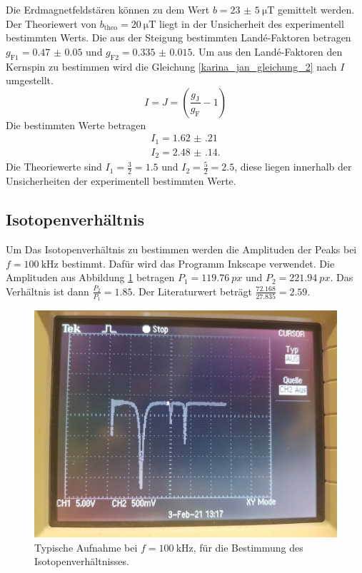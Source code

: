 \FloatBarrier
Die Erdmagnetfeldstären können zu dem Wert $b=\SI{23(5)}{\micro\tesla}$ gemittelt werden. Der Theoriewert von $b_{\text{theo}}=\SI{20}{\micro\tesla}$
liegt in der Unsicherheit des experimentell bestimmten Werts. 
Die aus der Steigung bestimmten Landé-Faktoren betragen $g_{\text{F1}}=\num{0.47(5)}$ und $g_{\text{F2}} = \num{0.335(15)}$.
Um aus den Landé-Faktoren den Kernspin zu bestimmen wird die Gleichung \ref{karina_jan_gleichung_2} nach $I$ umgestellt.
\begin{equation*}
  I=J=\left(\frac{g_{\text{J}}}{g_{\text{F}}}-1\right)
\end{equation*}
Die bestimmten Werte betragen 
\begin{gather*}
  I_1 = \num{1.62(21)}\\
  I_2 = \num{2.48(14)}.
\end{gather*}
Die Theoriewerte sind $I_1 = \frac{3}{2}= \num{1.5}$ und $I_2 = \frac{5}{2}=\num{2.5}$, diese liegen innerhalb der Unsicherheiten der
experimentell bestimmten Werte.
\subsection{Isotopenverhältnis}
Um Das Isotopenverhältnis zu bestimmen werden die Amplituden der Peaks bei $f= \SI{100}{\kilo\hertz}$ bestimmt.
Dafür wird das Programm Inkscape \cite{??} verwendet. Die Amplituden aus Abbildung \ref{fig:Isotopenverhältnis} 
betragen $P_{1} = \SI{119.76}{px}$ und $P_{2} = \SI{221.94}{px}$. Das Verhältnis ist dann $\frac{P_2}{P_1} = \num{1.85}$.
Der Literaturwert beträgt $\frac{\num{72.168}}{\num{27.835}} = \num{2.59}$.
\FloatBarrier
\begin{figure}
  \centering
  \includegraphics[width = \textwidth,keepaspectratio]{figure/Oszibild.pdf}
  \caption{Typische Aufnahme bei $f=\SI{100}{\kilo\hertz}$, für die Bestimmung des Isotopenverhältnisses.}
  \label{fig:Isotopenverhältnis}
\end{figure}
